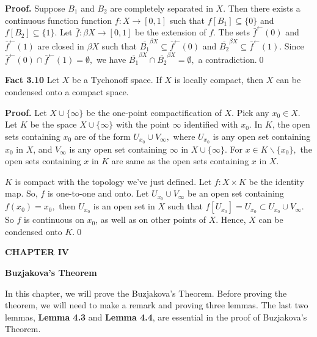\documentclass{article}
\begin{document}
																				      \vskip 15pt


																				      \textbf{Proof.} Suppose $B_1$ and $B_2$ are completely separated in $X$. Then there exists a continuous function function $f:X\rightarrow [0,1]$ such that 
																				      $f\left[B_1\right] \subseteq\{0\}$ and $f\left[B_2\right]\subseteq \{1\}.$ Let $\bar{f}: \beta X\rightarrow [0,1]$ be the extension of $f$. The sets $\bar{f}^\leftarrow(0)$ and $\bar{f}^{\leftarrow}(1)$ are closed in $\beta X$ such that $\overline{B_1}^{\beta X} \subseteq \bar{f}^\leftarrow(0)$ and $\overline{B_2}^{\beta X} \subseteq \bar{f}^\leftarrow(1).$ Since $\bar{f}^\leftarrow(0)\cap\bar{f}^\leftarrow(1)=\emptyset,$ we have $\overline{B_1}^{\beta X}\cap \overline{B_2}^{\beta X}=\emptyset,$ a contradiction.\qed 


																				      \vskip 30pt


																				      \textbf{Fact 3.10} Let $X$ be a Tychonoff space. If $X$ is locally compact, then $X$ can be condensed onto a compact space. 

																				      \vskip 15pt


																				      \textbf{Proof.} Let $X\cup \{\infty\}$ be the one-point compactification of $X$. Pick any $x_0\in X$. Let $K$ be the space $X\cup \{\infty\}$ with the point $\infty$ identified with $x_0$. In $K$, the open sets containing $x_0$ are of the form $U_{x_0} \cup V_{\infty},$ where $U_{x_0}$ is any open set containing $x_0$ in $X$, and $V_\infty$ is any open set containing $\infty$ in $X\cup \{\infty\}.$ For $x\in K\backslash \{x_0\},$ the open sets containing $x$ in $K$ are same as the open sets containing $x$ in $X$. 
																				      \vskip 10pt

																				      $K$ is compact with the topology we've just defined. Let $f:X\times K$ be the identity map. So, $f$ is one-to-one and onto. Let $U_{x_0}\cup V_\infty$ be an open set containing $f(x_0)=x_0,$ then $U_{x_0}$ is an open set in $X$ such that
																				      $f\left[U_{x_0}\right]=U_{x_0}\subset U_{x_0}\cup V_\infty.$  So $f$ is continuous on $x_0$, as well as on other points of $X$. Hence, $X$ can be condensed onto $K$.\qed


																				      \vskip 40pt


																				      \newpage
																				      \begin{center}
																				      \textbf{CHAPTER IV}
																				      \end{center}
																				      \vskip 40pt
																				      \begin{center}
																				      \textbf{Buzjakova's Theorem}
																				      \end{center}
																				      \vskip 20pt
																				      In this chapter, we will prove the Buzjakova's Theorem. Before proving the theorem, we will need to make a remark and proving three lemmas. The last two lemmas, \textbf{Lemma 4.3} and \textbf{Lemma 4.4}, are essential in the proof of Buzjakova's Theorem.
																				      \vskip 20pt
\end{document}
